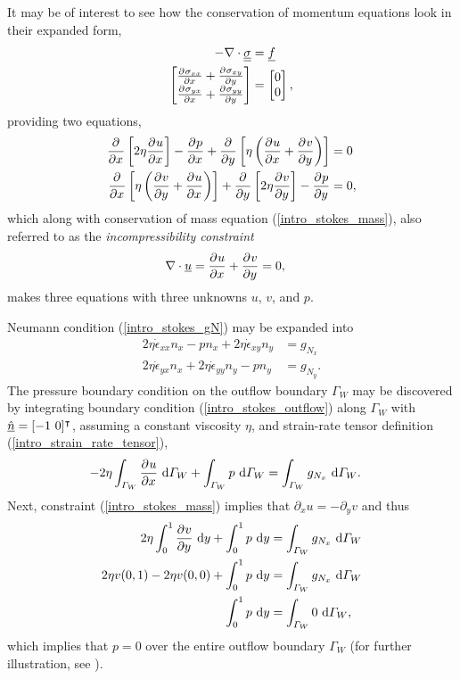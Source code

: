 It may be of interest to see how the conservation of momentum equations look in their expanded form,
\begin{align*}
  -\nabla \cdot \underline{\underline{\sigma}} &= \underline{f} \\
  \begin{bmatrix}
    \frac{\partial^{} \sigma_{xx}}{\partial x^{} } + \frac{\partial^{} \sigma_{xy}}{\partial y^{} } \\ 
    \frac{\partial^{} \sigma_{yx}}{\partial x^{} } + \frac{\partial^{} \sigma_{yy}}{\partial y^{} } \\ 
  \end{bmatrix} &=
  \begin{bmatrix}
    0 \\ 0
  \end{bmatrix},
\end{align*}
providing two equations,
\begin{align*}
    \frac{\partial^{} }{\partial x^{} } \left[2\eta \frac{\partial^{} u}{\partial x^{} } \right]  - \frac{\partial^{} p}{\partial x^{} } + \frac{\partial^{} }{\partial y^{} } \left[\eta \left( \frac{\partial^{} u}{\partial x^{} } + \frac{\partial^{} v}{\partial y^{} } \right) \right] &= 0 \\ 
    \frac{\partial^{} }{\partial x^{} } \left[\eta \left( \frac{\partial^{} v}{\partial y^{} } + \frac{\partial^{} u}{\partial x^{} } \right) \right]  + \frac{\partial^{} }{\partial y^{} } \left[2\eta \frac{\partial^{} v}{\partial y^{} } \right] - \frac{\partial^{} p}{\partial y^{} } &= 0, 
\end{align*}
which along with conservation of mass equation (\ref{intro_stokes_mass}), also referred to as the \emph{incompressibility constraint}
\begin{align*}
  \nabla \cdot \underline{u} &= \frac{\partial^{} u}{\partial x^{} } + \frac{\partial^{} v}{\partial y^{} } = 0, 
\end{align*}
makes three equations with three unknowns $u$, $v$, and $p$.

Neumann condition (\ref{intro_stokes_gN}) may be expanded into
\begin{align}
  \label{intro_stokes_outflow}
  2 \eta \dot{\epsilon}_{xx} n_x - p n_x + 2 \eta \dot{\epsilon}_{xy} n_y &= g_{N_x} \\
  2 \eta \dot{\epsilon}_{yx} n_x + 2 \eta \dot{\epsilon}_{yy} n_y - p n_y &= g_{N_y}.
\end{align}
The pressure boundary condition on the outflow boundary $\Gamma_W$ may be discovered by integrating boundary condition (\ref{intro_stokes_outflow}) along $\Gamma_W$ with $\underline{\hat{n}} = [-1\ 0]^\intercal$, assuming a constant viscosity $\eta$, and strain-rate tensor definition (\ref{intro_strain_rate_tensor}),
\begin{align*}
  - 2 \eta \int_{\varGamma_W} \frac{\partial^{} u}{\partial x^{} } \ \mathrm{d}\varGamma_W + \int_{\varGamma_W} p \ \mathrm{d}\varGamma_W &= \int_{\varGamma_W} g_{N_x} \ \mathrm{d}\varGamma_W.
\end{align*}
Next, constraint (\ref{intro_stokes_mass}) implies that $\partial_x u = - \partial_y v$ and thus
\begin{align*}
  2 \eta \int_0^1 \frac{\partial^{} v}{\partial y^{} } \ \mathrm{d}y + \int_0^1 p \ \mathrm{d}y &= \int_{\varGamma_W} g_{N_x} \ \mathrm{d}\varGamma_W \\
  2 \eta v(0,1) - 2 \eta v(0,0) + \int_0^1 p \ \mathrm{d}y &= \int_{\varGamma_W} g_{N_x} \ \mathrm{d}\varGamma_W \\
  \int_0^1 p \ \mathrm{d}y &= \int_{\varGamma_W} 0 \ \mathrm{d}\varGamma_W,
\end{align*}
which implies that $p = 0$ over the entire outflow boundary $\Gamma_W$ (for further illustration, see \citet{elman_2005}).

